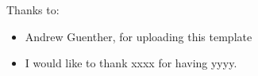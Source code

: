 \noindent
Thanks to:
\begin{itemize}
    \item Andrew Guenther, for uploading this template
    \item I would like to thank xxxx for having yyyy.
\end{itemize}
